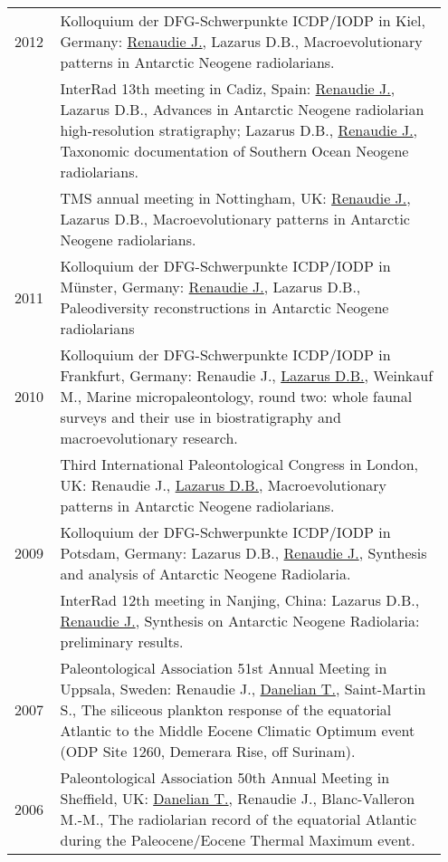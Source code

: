 \documentclass[11pt, a4paper]{article}
\begin{document}
\begin{longtable}{@{}p{0.1\linewidth} P{0.85\linewidth}@{}}
2012 & Kolloquium der DFG-Schwerpunkte ICDP/IODP in Kiel, Germany: \underline{Renaudie J.}, Lazarus D.B., Macroevolutionary patterns in Antarctic Neogene radiolarians.\\
 & InterRad 13th meeting in Cadiz, Spain: \underline{Renaudie J.}, Lazarus D.B., Advances in Antarctic Neogene radiolarian high-resolution stratigraphy; Lazarus D.B., \underline{Renaudie J.}, Taxonomic documentation of Southern Ocean Neogene radiolarians.\\
 & TMS annual meeting in Nottingham, UK: \underline{Renaudie J.}, Lazarus D.B., Macroevolutionary patterns in Antarctic Neogene radiolarians.\\
2011 & Kolloquium der DFG-Schwerpunkte ICDP/IODP in Münster, Germany: \underline{Renaudie J.}, Lazarus D.B., Paleodiversity reconstructions in Antarctic Neogene radiolarians\\
2010 & Kolloquium der DFG-Schwerpunkte ICDP/IODP in Frankfurt, Germany: Renaudie J., \underline{Lazarus D.B.}, Weinkauf M., Marine micropaleontology, round two: whole faunal surveys and their use in biostratigraphy and macroevolutionary research.\\
 & Third International Paleontological Congress in London, UK: Renaudie J., \underline{Lazarus D.B.}, Macroevolutionary patterns in Antarctic Neogene radiolarians.\\
2009 & Kolloquium der DFG-Schwerpunkte ICDP/IODP in Potsdam, Germany: Lazarus D.B., \underline{Renaudie J.}, Synthesis and analysis of Antarctic Neogene Radiolaria.\\
 & InterRad 12th meeting in Nanjing, China: Lazarus D.B., \underline{Renaudie J.}, Synthesis on Antarctic Neogene Radiolaria: preliminary results.\\
2007 & Paleontological Association 51st Annual Meeting in Uppsala, Sweden: Renaudie J., \underline{Danelian T.}, Saint-Martin S., The siliceous plankton response of the equatorial Atlantic to the Middle Eocene Climatic Optimum event (ODP Site 1260, Demerara Rise, off Surinam).\\
2006 & Paleontological Association 50th Annual Meeting in Sheffield, UK: \underline{Danelian T.}, Renaudie J., Blanc-Valleron M.-M., The radiolarian record of the equatorial Atlantic during the Paleocene/Eocene Thermal Maximum event.\\
\end{longtable}
\end{document}
